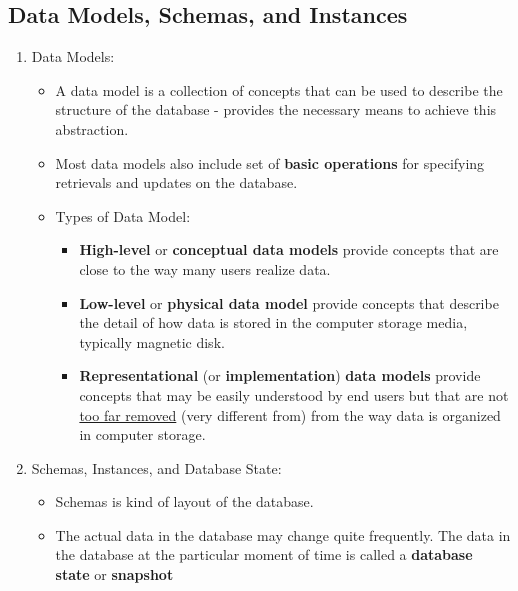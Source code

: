 \documentclass[10pt]{article}
\newcommand{\tf}{\textbf}
\begin{document}
\subsection{Data Models, Schemas, and Instances}
\begin{enumerate}
	\item Data Models:
	\begin{itemize}
		\item A data model is a collection of concepts that can be used to describe the structure of the database - provides the necessary means to achieve this abstraction.
		\item Most data models also include set of \tf{basic operations} for specifying retrievals and updates on the database.
		\item Types of Data Model:
		\begin{itemize}
			\item \tf{High-level} or \tf{conceptual data models} provide concepts that are close to the way many users realize data.
			\item \tf{Low-level} or \tf{physical data model} provide concepts that describe the detail of how data is stored in the computer storage media, typically magnetic disk.
			\item \tf{Representational} (or \tf{implementation}) \tf{data models} provide concepts that may be easily understood by end users but that are not \underline{too far removed} (very different from) from the way data is organized in computer storage.
		\end{itemize}
	\end{itemize}

	\item Schemas, Instances, and Database State:
	\begin{itemize}
		\item Schemas is kind of layout of the database.
		\item The actual data in the database may change quite frequently. The data in the database at the particular moment of time is called a \tf{database state} or \tf{snapshot}
	\end{itemize}
\end{enumerate}
\end{document}
